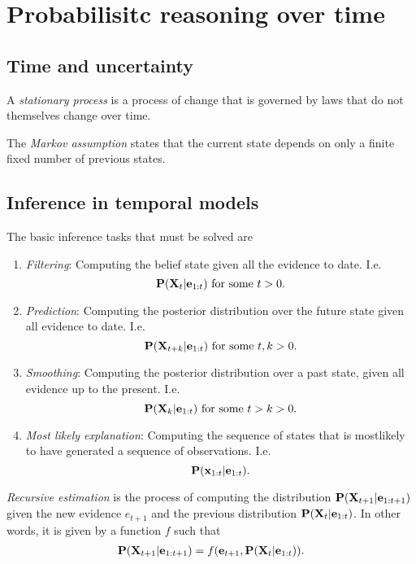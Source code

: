 \documentclass{article}
\begin{document}
\section{Probabilisitc reasoning over time}

\subsection{Time and uncertainty}

\begin{definition}[R\&N p. 568]
	A \emph{stationary process} is a process of change that is governed by laws
	that do not themselves change over time.
\end{definition}

\begin{definition}
	The \emph{Markov assumption} states that the current
	state depends on only a finite fixed number of previous states.
\end{definition}

\subsection{Inference in temporal models}

\begin{proposition}[R\&N p. 570]
	The basic inference tasks that must be solved are
	\begin{enumerate}
		\item \emph{Filtering}: Computing the belief state given all the evidence to date.
		      I.e. \[\P(\vec X_t | \vec e_{1:t}) \text{ for some } t>0.\]
		\item \emph{Prediction}: Computing the posterior distribution over the future
		      state given all evidence to date. I.e. \[\P(\vec X_{t+k}|\vec e_{1:t})\text{ for some }t,k>0.\]
		\item \emph{Smoothing}: Computing the posterior distribution over a past state, given all evidence
		      up to the present. I.e. \[\P(\vec X_k | \vec e_{1:t}) \text{ for some } t>k>0.\]
		\item \emph{Most likely explanation}: Computing the sequence of states that is mostlikely to have
		      generated a sequence of observations. I.e. \[\P(\vec x_{1:t}|\vec e_{1:t}).\]
	\end{enumerate}
\end{proposition}


\begin{definition}
	\emph{Recursive estimation} is the process of computing the distribution $\P(\vec X_{t+1}|\vec e_{1:t+1})$
	given the new evidence $e_{t+1}$ and the previous distribution $\P(\vec X_t|\vec e_{1:t})$. In other words,
	it is given by a function $f$ such that
	\begin{align*}
		\P(\vec X_{t+1}|\vec e_{1:t+1})=f(\vec e_{t+1}, \P(\vec X_t|\vec e_{1:t})).
	\end{align*}
\end{definition}
\end{document}
